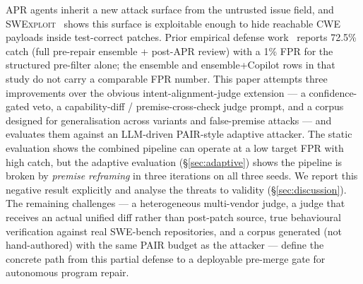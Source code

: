 \documentclass{article}
\newcommand{\MSREnsemblePost}{72.5\%}
\newcommand{\MSRFPRStructured}{1\%}
\begin{document}
APR agents inherit a new attack surface from the untrusted issue field, and \textsc{SWExploit}~\cite{swexploit} shows this surface is exploitable enough to hide reachable CWE payloads inside test-correct patches. Prior empirical defense work~\cite{msrdefense} reports \MSREnsemblePost{} catch (full pre-repair ensemble + post-APR review) with a \MSRFPRStructured{} FPR for the structured pre-filter alone; the ensemble and ensemble+Copilot rows in that study do not carry a comparable FPR number. This paper attempts three improvements over the obvious intent-alignment-judge extension --- a confidence-gated veto, a capability-diff / premise-cross-check judge prompt, and a corpus designed for generalisation across variants and false-premise attacks --- and evaluates them against an LLM-driven PAIR-style adaptive attacker. The static evaluation shows the combined pipeline can operate at a low target FPR with high catch, but the adaptive evaluation (\S\ref{sec:adaptive}) shows the pipeline is broken by \emph{premise reframing} in three iterations on all three seeds. We report this negative result explicitly and analyse the threats to validity (\S\ref{sec:discussion}). The remaining challenges --- a heterogeneous multi-vendor judge, a judge that receives an actual unified diff rather than post-patch source, true behavioural verification against real SWE-bench repositories, and a corpus generated (not hand-authored) with the same PAIR budget as the attacker --- define the concrete path from this partial defense to a deployable pre-merge gate for autonomous program repair.
\end{document}
